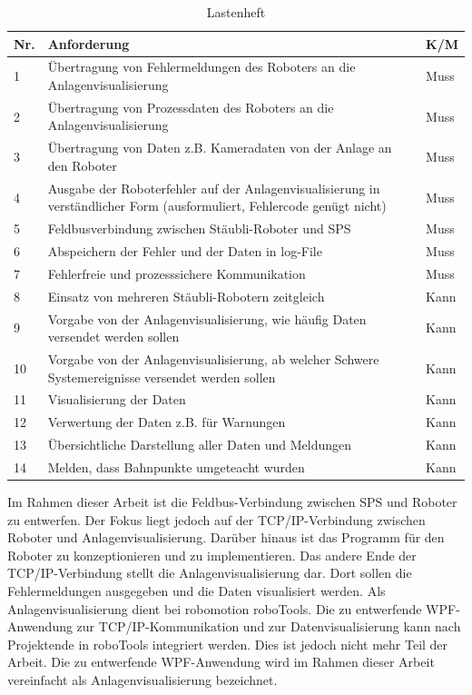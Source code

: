 \documentclass[ a4paper,
                oneside,
                toc=bibliography,
                toc=listof
                ]{scrbook}
\begin{document}
	\begin{longtable}{|p{0.3cm}|p{12cm}|p{1cm}|}
		\caption{Lastenheft}
		\label{table:Lastenheft}\\
		\hline
		Nr. & Anforderung & K/M \\ [0.5ex] 
		\hline
		\endhead
		1 & Übertragung von Fehlermeldungen des Roboters an die Anlagenvisualisierung & Muss  \\ 
		2 & Übertragung von Prozessdaten des Roboters an die Anlagenvisualisierung & Muss  \\
		3 & Übertragung von Daten z.B. Kameradaten von der Anlage an den Roboter & Muss  \\
		4 & Ausgabe der Roboterfehler auf der Anlagenvisualisierung in verständlicher Form (ausformuliert, Fehlercode genügt nicht) & Muss  \\
		5 & Feldbusverbindung zwischen Stäubli-Roboter und SPS & Muss  \\
		6 & Abspeichern der Fehler und der Daten in log-File & Muss  \\ 
		7 & Fehlerfreie und prozesssichere Kommunikation & Muss  \\ 
		8 & Einsatz von mehreren Stäubli-Robotern zeitgleich  & Kann  \\
		9 & Vorgabe von der Anlagenvisualisierung, wie häufig Daten versendet werden sollen & Kann  \\
		10 & Vorgabe von der Anlagenvisualisierung, ab welcher Schwere Systemereignisse versendet werden sollen & Kann  \\ 
		11 & Visualisierung der Daten & Kann  \\
		\hline
		12 & Verwertung der Daten z.B. für Warnungen & Kann  \\  
		13 & Übersichtliche Darstellung aller Daten und Meldungen & Kann  \\ 
		14 & Melden, dass Bahnpunkte umgeteacht wurden & Kann  \\ 
		\hline
	\end{longtable}
	\noindent Im Rahmen dieser Arbeit ist die Feldbus-Verbindung zwischen SPS und Roboter zu entwerfen. Der Fokus liegt jedoch auf der TCP/IP-Verbindung zwischen Roboter und Anlagenvisualisierung. Darüber hinaus ist das Programm für den Roboter zu konzeptionieren und zu implementieren. Das andere Ende der TCP/IP-Verbindung stellt die Anlagenvisualisierung dar. Dort sollen die Fehlermeldungen ausgegeben und die Daten visualisiert werden. Als Anlagenvisualisierung dient bei robomotion roboTools. Die zu entwerfende WPF-Anwendung zur TCP/IP-Kommunikation und zur Datenvisualisierung kann nach Projektende in roboTools integriert werden. Dies ist jedoch nicht mehr Teil der Arbeit. Die zu entwerfende WPF-Anwendung wird im Rahmen dieser Arbeit vereinfacht als Anlagenvisualisierung bezeichnet.\\
\end{document}
